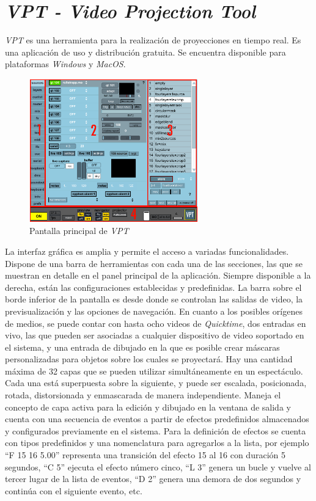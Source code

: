 \section{\emph{VPT - Video Projection Tool}}
\emph{VPT} \cite{VPT} es una herramienta para la realización de proyecciones en tiempo real. Es una aplicación de uso y distribución gratuita. Se encuentra disponible para plataformas \emph{Windows} y \emph{MacOS}.

\begin{figure}[H]
  \centering
    \includegraphics[width=0.65\textwidth]{./Apendices/Cap3_aplicaciones/apps-vpt.png}
  \caption{Pantalla principal de \emph{VPT}}%
  \label{fig:Apps-VPT}
\end{figure}

La interfaz gráfica es amplia y permite el acceso a variadas funcionalidades. Dispone de una barra de herramientas con cada una de las secciones, las que se muestran en detalle en el panel principal de la aplicación. Siempre disponible a la derecha, están las configuraciones establecidas y predefinidas. La barra sobre el borde inferior de la pantalla es desde donde se controlan las salidas de video, la previsualización y las opciones de navegación.
En cuanto a los posibles orígenes de medios, se puede contar con hasta ocho videos de \emph{Quicktime}, dos entradas en vivo, las que pueden ser asociadas a cualquier dispositivo de video soportado en el sistema, y una entrada de dibujado en la que es posible crear máscaras personalizadas para objetos sobre los cuales se proyectará.
Hay una cantidad máxima de 32 capas que se pueden utilizar simultáneamente en un espectáculo. Cada una está superpuesta sobre la siguiente, y puede ser escalada, posicionada, rotada, distorsionada y enmascarada de manera independiente. Maneja el concepto de capa activa para la edición y dibujado en la ventana de salida y cuenta con una secuencia de eventos a partir de efectos predefinidos almacenados y configurados previamente en el sistema. Para la definición de efectos se cuenta con tipos predefinidos y una nomenclatura para agregarlos a la lista, por ejemplo ``F 15 16 5.00'' representa una transición del efecto 15 al 16 con duración 5 segundos, ``C 5'' ejecuta el efecto número cinco, ``L 3'' genera un bucle y vuelve al tercer lugar de la lista de eventos, ``D 2'' genera una demora de dos segundos y continúa con el siguiente evento, etc.

